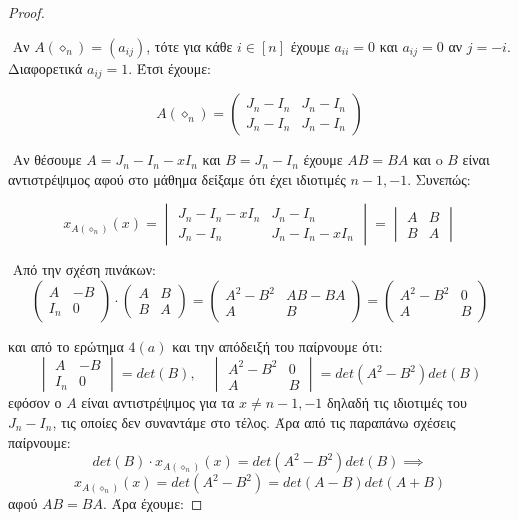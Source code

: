 \documentclass[oneside,a4paper]{article}
\begin{document}
\begin{proof} $ $


	$ $\newline
	Αν $A(\diamond_n) = (a_{ij})$, τότε για κάθε $i \in [n]$ έχουμε $a_{ii} = 0$ και $a_{ij} = 0$ αν $j = -i$. Διαφορετικά $a_{ij} = 1$. Έτσι έχουμε:
	
	
	$$A(\diamond_n) = 
	\begin{pmatrix}
		J_n - I_n & J_n - I_n \\
		J_n - I_n & J_n - I_n
	\end{pmatrix}$$

	$ $\newline
	Αν θέσουμε $A = J_n - I_n - xI_n$ και $B = J_n - I_n$ έχουμε $AB = BA$ και o $B$ είναι αντιστρέψιμος αφού στο μάθημα δείξαμε ότι έχει ιδιοτιμές $n-1,-1$. Συνεπώς:



	$$x_{A(\diamond_n)} (x) = 
	\begin{vmatrix}
		J_n - I_n - xI_n & J_n - I_n \\
		J_n - I_n & J_n - I_n - xI_n
	\end{vmatrix} = 
	\begin{vmatrix}
		A & B \\
		B & A
	\end{vmatrix}$$

	$ $\newline
	Από την σχέση πινάκων:
	$$
	\begin{pmatrix}
		A & -B \\
		I_n & 0
	\end{pmatrix} \cdot \begin{pmatrix}
		A & B \\
		B & A
	\end{pmatrix} = \begin{pmatrix}
		A^2 - B^2 & AB - BA \\
		A & B
	\end{pmatrix} = \begin{pmatrix}
		A^2 - B^2 & 0 \\
		A & B
	\end{pmatrix}$$

	και από το ερώτημα $4(a)$ και την απόδειξή του παίρνουμε ότι:
	$$\begin{vmatrix}
		A & -B \\
		I_n & 0 
	\end{vmatrix} = det(B),
	\quad \begin{vmatrix}
		A^2 - B^2 & 0 \\
		A & B
	\end{vmatrix} = det(A^2-B^2)det(B)$$
	εφόσον ο $A$ είναι αντιστρέψιμος για τα $x \neq n-1,-1$ δηλαδή τις ιδιοτιμές του $J_n - I_n$, τις οποίες δεν συναντάμε στο τέλος. Άρα από τις παραπάνω σχέσεις παίρνουμε:
	$$det(B) \cdot x_{A(\diamond_n)} (x)  = det(A^2 - B^2) det(B) \implies $$
	$$x_{A(\diamond_n)} (x) = det(A^2 - B^2) = det(A-B)det(A+B)$$
	αφού $AB = BA$. Άρα έχουμε:


\end{proof}
\end{document}

